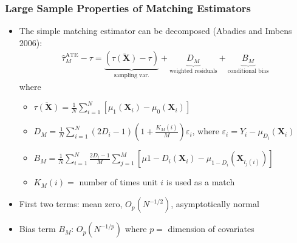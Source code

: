 \documentclass[10pt, handout]{beamer}
\begin{document}
\begin{frame}
  \frametitle{Large Sample Properties of Matching Estimators}

  \begin{itemize}
    \item The simple matching estimator can be decomposed (Abadies and Imbens 2006):
    \begin{align*}
      \hat{\tau}_{M}^{\text{ATE}} - \tau = \underbrace{\left( \overline{\tau(\mathbf{X})} - \tau \right)}_{\text{sampling var.}} + \underbrace{D_M}_{\text{weighted residuals}} + \underbrace{B_M}_{\text{conditional bias}}
    \end{align*}
    where
    \begin{itemize}
      \item $\overline{\tau(\mathbf{X})} = \frac{1}{N} \sum_{i = 1}^N \left[ \mu_1(\mathbf{X}_i) - \mu_0(\mathbf{X}_i) \right]$ 
      \item $D_M = \frac{1}{N} \sum_{i = 1}^N \left( 2D_i - 1 \right) \left( 1 + \frac{K_M(i)}{M} \right)\varepsilon_i$, where $\varepsilon_i = Y_i - \mu_{D_i}(\mathbf{X}_i)$
      \item $B_M =\frac{1}{N} \sum_{i = 1}^N \frac{2D_i - 1}{M} \sum_{j = 1}^M \left[ \mu{1 - D_i}(\mathbf{X}_i) - \mu_{1 - D_i}(\mathbf{X}_{l_j(i)}) \right]$
      \item $K_M(i) = $ number of times unit $i$ is used as a match
    \end{itemize}
    \item First two terms: mean zero, $O_p \left( N^{-1 / 2} \right)$, asymptotically normal 
    \item Bias term $B_M$: $O_p \left( N^{-1 / p} \right)$ where $p = $ dimension of covariates
  \end{itemize}

\end{frame}
\end{document}
